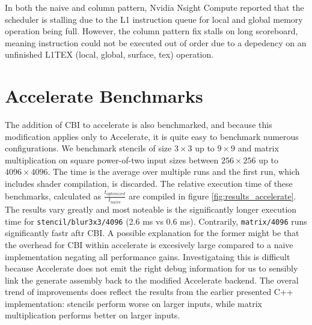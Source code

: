 In both the naive and column pattern, Nvidia Nsight Compute reported that the scheduler is stalling due to the L1 instruction queue for local and global memory operation being full.
However, the column pattern fix stalls on long scoreboard, meaning instruction could not be executed out of order due to a depedency on an unfinished L1TEX (local, global, surface, tex) operation.

\section{Accelerate Benchmarks}
\label{sec:accelerate_benchmark}
The addition of CBI to accelerate is also benchmarked, and because this modification applies only to Accelerate, it is quite easy to benchmark numerous configurations.
We benchmark stencils of size $3\times 3$ up to $9\times 9$ and matrix multiplication on square power-of-two input sizes between $256\times 256$ up to $4096\times 4096$.
The time is the average over multiple runs and the first run, which includes shader compilation, is discarded.
The relative execution time of these benchmarks, calculated as $\frac{t_{optimized}}{t_{naive}}$ are compiled in figure \ref{fig:results_accelerate}.
The results vary greatly and most noteable is the significantly longer execution time for \texttt{stencil/blur3x3/4096} (2.6 ms vs 0.6 ms). Contrarily, \texttt{matrix/4096} runs significantly fastr aftr CBI.
A possible explanation for the former might be that the overhead for CBI within accelerate is excesively large compared to a naive implementation negating all performance gains.
Investigataing this is difficult because Accelerate does not emit the right debug information for us to sensibly link the generate assembly back to the modified Accelerate backend.
The overal trend of improvements does reflect the results from the earlier presented C++ implementation: stencils perform worse on larger inputs, while matrix multiplication performs better on larger inputs.

